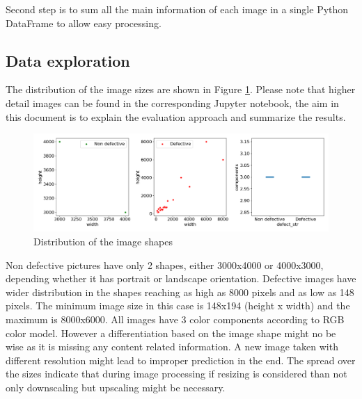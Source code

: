 \documentclass[10pt, final]{article}
\begin{document}
Second step is to sum all the main information of each image in a single Python DataFrame to allow easy processing.

\subsection{Data exploration} \label{sec:data_exploration}
The distribution of the image sizes are shown in Figure \ref{fig:shape_dist}.
Please note that higher detail images can be found in the corresponding Jupyter notebook, the aim in this document
is to explain the evaluation approach and summarize the results.
\begin{figure}[!ht]
	\centering
	\includegraphics[width=\textwidth]{./tex_graphs/shapes.png}
	\caption{Distribution of the image shapes}
	\label{fig:shape_dist}
\end{figure}

Non defective pictures have only 2 shapes, either 3000x4000 or 4000x3000, depending whether it has
portrait or landscape orientation.
Defective images have wider distribution in the shapes reaching as high as 8000 pixels and as low as 148 pixels.
The minimum image size in this case is 148x194 (height x width) and the maximum is 8000x6000.
All images have 3 color components according to RGB color model.
However a differentiation based on the image shape might no be wise as it is missing any content related information.
A new image taken with different resolution might lead to improper prediction in the end.
The spread over the sizes indicate that during image processing if resizing is considered than not only
downscaling but upscaling might be necessary.
\end{document}
